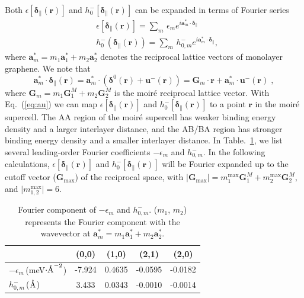 \documentclass[aps,prx,10pt,twocolumn,superscriptaddress]{revtex4}
\def\angstrom{\mbox{\normalfont\AA}}
\def\angstrom{\mbox{\normalfont\AA}}
\begin{document}
Both $\epsilon[\bm{\delta}_{\parallel}(\textbf{r})]$  and $h^{-}_{0}[\bm{\delta}_{\parallel}(\textbf{r})]$ can be expanded in terms of Fourier series
\begin{align}
&\epsilon[\bm{\delta}_{\parallel}(\textbf{r})]=\sum_{m}\,\epsilon_{m}e^{i\textbf{a}^{*}_{m}\cdot\bm{\delta}_{\parallel}}\\
&h^{-}_{0}(\bm{\delta}_{\parallel}(\textbf{r}))=\sum_{m}\,h^{-}_{0,m}e^{i\textbf{a}^{*}_{m}\cdot\bm{\delta}_{\parallel}},
\end{align} 
where $\textbf{a}^{*}_{m}\!=\!m_{1}\textbf{a}^{*}_{1}+m_{2}\textbf{a}^{*}_{2}$ denotes the reciprocal lattice vectors of monolayer graphene. We note that 
\begin{equation}
\textbf{a}^{*}_{m}\cdot\bm{\delta}_{\parallel}(\textbf{r})\!=\!\textbf{a}^{*}_{m}\cdot(\bm{\delta}^{0}(\textbf{r})+\bm{u}^{-}(\textbf{r}))\!=\!\textbf{G}_{m}\cdot\textbf{r}+\textbf{a}^{*}_{m}\cdot\textbf{u}^{-}(\textbf{r})\;,
\label{eq:au}
\end{equation}
where $\textbf{G}_{m}\!=\!m_{1}\textbf{G}^{M}_{1}+m_{2}\textbf{G}^{M}_{2}$ is the moir\'e reciprocal lattice vector. With Eq.~(\ref{eq:au}) we can map $\epsilon[\bm{\delta}_{\parallel}(\textbf{r})]$ and $h^{-}_{0}[\bm{\delta}_{\parallel}(\textbf{r})]$ to a point $\mathbf{r}$ in the moir\'e supercell. The AA region of the moir\'e supercell has weaker binding energy density and a larger interlayer distance, and the AB/BA region has stronger binding energy density and a smaller interlayer distance.  In Table.~\ref{tab:bindingfourier}, we list several leading-order Fourier coefficients $-\epsilon_{m}$ and $h^{-}_{0,m}$. In the following calculations, $\epsilon[\bm{\delta}_{\parallel}(\textbf{r})]$ and $h^{-}_{0}[\bm{\delta}_{\parallel}(\textbf{r})]$ will be Fourier expanded up to the cutoff vector ($\bm{G}_{\textrm{max}}$) of the reciprocal space, with $\vert\bm{G}_{\textrm{max}}\vert= m_1^{\textrm{max}}\mathbf{G}_{1}^{M}+m_2^{\textrm{max}}\mathbf{G}_{2}^{M}$, and $\vert m_{1,2}^{\textrm{max}}\vert=6$.
\begin{table}[]
    \centering
    \caption{Fourier component of $-\epsilon_{m}$ and $h^{-}_{0,m}$. ($m_{1}$, $m_{2}$) represents the Fourier component with the wavevector at $\textbf{a}^{*}_{m}\!=\!m_{1}\textbf{a}^{*}_{1}+m_{2}\textbf{a}^{*}_{2}$. }
    \begin{tabular}{l|c|c|c|c}
    \hline\hline
        & (0,0) & (1,0)  & (2,1) & (2,0) \\
      \hline
       $-\epsilon_{m}\,$(meV$\cdot\angstrom^{-2}$)  & -7.924 & 0.4635 & -0.0595 &-0.0182 \\
       $h^{-}_{0,m}\,$($\angstrom$)   & 3.433 & 0.0343 & -0.0010 &-0.0014 \\
       \hline\hline
    \end{tabular}
    \label{tab:bindingfourier}
\end{table}
\end{document}
